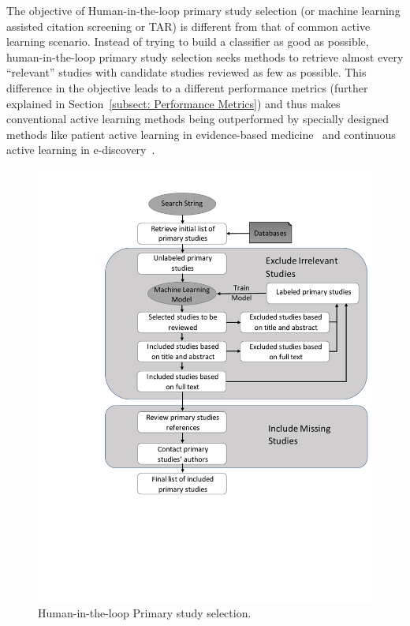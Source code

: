 \documentclass[final,twocolumn,5p]{elsarticle}
\theoremstyle{break}
\begin{document}
The objective of Human-in-the-loop primary study selection (or machine learning
assisted citation screening or TAR) is different from that of common active
learning scenario. Instead of trying to build a classifier as good as possible,
human-in-the-loop primary study selection seeks methods to retrieve almost every
``relevant'' studies with candidate studies reviewed as few as possible. This
difference in the objective leads to a different performance metrics (further explained in Section~\ref{subsect: Performance Metrics}) and thus
makes conventional active learning methods being outperformed by specially
designed methods like patient active learning in evidence-based
medicine~\cite{wallace2010semi} and continuous active learning in
e-discovery~\cite{cormack2014evaluation,cormack2015autonomy}.


\begin{figure}[!t]
    \centering
    \includegraphics[width=\linewidth]{Learning_based_primary_study_selection.pdf}
    \caption{Human-in-the-loop Primary study selection.}
    \label{fig: learning}
\end{figure}
\end{document}
